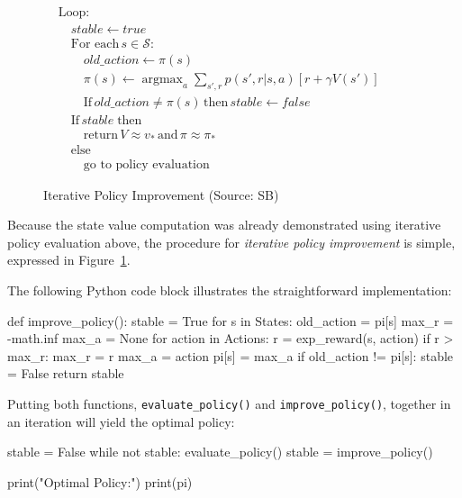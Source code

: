 \begin{figure}
\begin{pseudocodebox}
\small
\vspace{-\baselineskip}
\begin{align*}
&\text{Loop:} \\
&\quad stable \leftarrow true \\
&\quad \text{For each}\, s \in \mathcal{S}: \\
&\quad \quad old\_action \leftarrow \pi(s) \\
&\quad \quad \pi (s) \leftarrow \operatorname*{argmax}\nolimits_a \sum\nolimits_{s', r} p(s', r|s, a) [r + \gamma V(s')] \hspace{1in} \\
&\quad \quad \text{If}\, old\_action \neq \pi(s) \, \text{then} \, stable \leftarrow false \\
&\quad \text{If}\, stable \; \text{then} \\
&\quad \quad \text{return}\, V \approx v_*\, \text{and} \, \pi \approx \pi_* \\
&\quad \text{else} \\
&\quad \quad \text{go to policy evaluation}
\end{align*}
\end{pseudocodebox}
\caption{Iterative Policy Improvement (Source: SB)}
\label{fig:policyimprovement}
\end{figure}

Because the state value computation was already demonstrated using iterative policy evaluation above, the procedure for \emph{iterative policy improvement} is simple, expressed in Figure~\ref{fig:policyimprovement}. 

\begin{withcode}
The following Python code block illustrates the straightforward implementation:

\begin{pythoncode}
def improve_policy():
    stable = True
    for s in States:
        old_action = pi[s]
        max_r = -math.inf
        max_a = None
        for action in Actions:
            r = exp_reward(s, action)
            if r > max_r:
                max_r = r
                max_a = action
        pi[s] = max_a
        if old_action != pi[s]:
            stable = False
    return stable
\end{pythoncode}

Putting both functions, \texttt{evaluate\_policy()} and \texttt{improve\_policy()}, together in an iteration will yield the optimal policy:

\begin{pythoncode}
stable = False
while not stable:
    evaluate_policy()
    stable = improve_policy()

print("Optimal Policy:")
print(pi)
\end{pythoncode}
\end{withcode}

